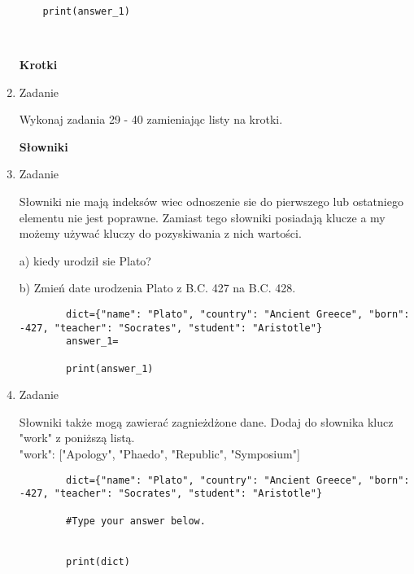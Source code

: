 \documentclass[11pt]{article}
\begin{document}
\begin{enumerate}
\begin{lstlisting}
	print(answer_1)
	
	
\end{lstlisting}


		

\medskip
\begin{Large}
	\textbf{Krotki}
\end{Large}

\item 
\begin{Large}
	Zadanie
\end{Large}
 \par 
 Wykonaj zadania 29 - 40  zamieniając listy na krotki.
 
 \medskip
 \begin{Large}
 	\textbf{Słowniki}
 \end{Large}
 
 \item\begin{Large}
 	Zadanie
 \end{Large}
	\par
	Słowniki nie mają indeksów wiec odnoszenie sie do pierwszego lub ostatniego elementu nie jest poprawne. Zamiast tego słowniki posiadają klucze a my możemy używać kluczy do pozyskiwania z nich wartości.
	\par
	a) kiedy urodził sie Plato?
	\par
	b) Zmień date urodzenia Plato z  B.C. 427 na B.C. 428.
	
	\begin{lstlisting}
		dict={"name": "Plato", "country": "Ancient Greece", "born": -427, "teacher": "Socrates", "student": "Aristotle"}
		answer_1=
		
		print(answer_1)
	\end{lstlisting}

	\item
	\begin{Large}
		Zadanie
	\end{Large}
	\par
	Słowniki także mogą zawierać zagnieżdżone dane. Dodaj do słownika klucz "work" z poniższą listą.\\
	"work": ["Apology", "Phaedo", "Republic", "Symposium"]
	\begin{lstlisting}
		dict={"name": "Plato", "country": "Ancient Greece", "born": -427, "teacher": "Socrates", "student": "Aristotle"}
		
		#Type your answer below.
		
		
		print(dict)
	\end{lstlisting}


\end{enumerate}
\end{document}
